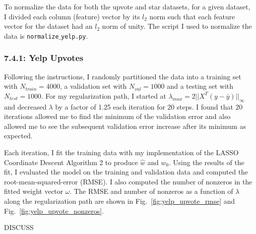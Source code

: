 \documentclass[12pt]{amsart}
\begin{document}
To normalize the data for both the upvote and star datasets, for a given dataset, I divided each column (feature) vector by its $l_2$ norm such that each feature vector for the dataset had an $l_2$ norm of unity.  The script I used to normalize the data is {\tt normalize$\_$yelp.py}.

\subsubsection*{7.4.1: Yelp Upvotes}

Following the instructions, I randomly partitioned the data into a training set with $N_{train} = 4000$, a validation set with $N_{val} = 1000$ and a testing set with $N_{test} = 1000$.  For my regularization path, I started at $\lambda_{max} = 2 ||X^{T}(y - \bar{y}) ||_{\infty}$ and decreased $\lambda$ by a factor of 1.25 each iteration for 20 steps.  I found that 20 iterations allowed me to find the minimum of the validation error and also allowed me to see the subsequent validation error increase after its minimum as expected.

Each iteration, I fit the training data with my implementation of the LASSO Coordinate Descent Algorithm 2 to produce $\hat{w}$ and $w_0$.  Using the results of the fit, I evaluated the model on the training and validation data and computed the root-mean-squared-error (RMSE).  I also computed the number of nonzeros in the fitted weight vector $\omega$.  The RMSE and number of nonzeros as a function of $\lambda$ along the regularization path are shown in Fig.~\ref{fig:yelp_upvote_rmse} and Fig.~\ref{fig:yelp_upvote_nonzeros}.

DISCUSS
\end{document}
